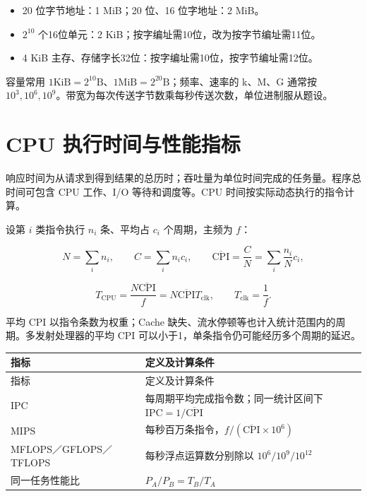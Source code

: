 \begin{itemize}
\tightlist
\item
  20 位字节地址：1 MiB；20 位、16 位字地址：2 MiB。
\item
  \(2^{10}\) 个16位单元：2 KiB；按字编址需10位，改为按字节编址需11位。
\item
  4 KiB 主存、存储字长32位：按字编址需10位，按字节编址需12位。
\end{itemize}

容量常用 \(1\mathrm{KiB}=2^{10}\mathrm B\)、\(1\mathrm{MiB}=2^{20}\mathrm B\)；频率、速率的 k、M、G 通常按 \(10^3,10^6,10^9\)。带宽为每次传送字节数乘每秒传送次数，单位进制服从题设。

\section{CPU 执行时间与性能指标}\label{CO01-performance}

响应时间为从请求到得到结果的总历时；吞吐量为单位时间完成的任务量。程序总时间可包含 CPU 工作、I/O 等待和调度等。CPU 时间按实际动态执行的指令计算。

设第 \(i\) 类指令执行 \(n_i\) 条、平均占 \(c_i\) 个周期，主频为 \(f\)：

\[N=\sum_i n_i,\qquad C=\sum_i n_i c_i,\qquad\overline{\mathrm{CPI}}=\frac{C}{N}=\sum_i\frac{n_i}{N}c_i,\]

\[T_{\mathrm{CPU}}=\frac{N\overline{\mathrm{CPI}}}{f}=N\overline{\mathrm{CPI}}T_{\mathrm{clk}},\qquad T_{\mathrm{clk}}=\frac1f.\]

平均 CPI 以指令条数为权重；Cache 缺失、流水停顿等也计入统计范围内的周期。多发射处理器的平均 CPI 可以小于1，单条指令仍可能经历多个周期的延迟。

\par\smallskip
\begin{wideblock}
{\fontsize{9.3}{12}\selectfont\setlength{\tabcolsep}{2.5pt}\setlength{\LTleft}{0pt}\setlength{\LTright}{0pt}
\begin{longtable}{@{}>{\raggedright\arraybackslash}p{}>{\raggedright\arraybackslash}p{}@{}}
\toprule
指标 & 定义及计算条件 \\

\midrule\endfirsthead\toprule
指标 & 定义及计算条件 \\

\midrule\endhead\bottomrule\endfoot
IPC & 每周期平均完成指令数；同一统计区间下 \(\mathrm{IPC}=1/\overline{\mathrm{CPI}}\) \\

MIPS & 每秒百万条指令，\(f/(\overline{\mathrm{CPI}}\times10^6)\) \\

MFLOPS／GFLOPS／TFLOPS & 每秒浮点运算数分别除以 \(10^6/10^9/10^{12}\) \\

同一任务性能比 & \(P_A/P_B=T_B/T_A\) \\

\end{longtable}}
\end{wideblock}
\par\smallskip

